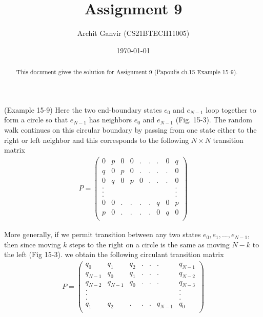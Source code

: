 \documentclass{beamer}
\title{Assignment 9}
\author{Archit Ganvir (CS21BTECH11005)}
\date{\today}
\begin{document}
\providecommand{\brak}[1]{\ensuremath{\left(#1\right)}}
\begin{frame}

\titlepage

\begin{abstract}
This document gives the solution for Assignment 9 (Papoulis ch.15 Example 15-9).
\end{abstract}

\end{frame}

\logo{}

\begin{frame}

(Example 15-9) Here the two end-boundary states $e_0$ and $e_{N - 1}$ loop together to form a circle so that $e_{N - 1}$ has neighbors $e_0$ and $e_{N - 1}$ (Fig. 15-3). The random walk continues on this circular boundary by passing from one state either to the right or left neighbor and this corresponds to the following $N \times N$ transition matrix
\begin{align}
P = 
\begin{pmatrix}
0 & p & 0 & 0 & . & . & . & 0 & q \\
q & 0 & p & 0 & . & . & . & . & 0 \\
0 & q & 0 & p & 0 & . & . & . & 0 \\
. & & & & & & & & . \\
. & & & & & & & & . \\
. & & & & & & & & . \\
0 & 0 & . & . & . & . & q & 0 & p \\
p & 0 & . & . & . & . & 0 & q & 0 \\
\end{pmatrix}
\end{align}

\end{frame}

\begin{frame}

More generally, if we permit transition between any two states $e_0, e_1,...,e_{N - 1}$, then since moving $k$ steps to the right on a circle is the same as moving $N - k$ to the left (Fig 15-3). we obtain the following circulant transition matrix
\begin{align}
P = 
\begin{pmatrix}
q_0 & q_1 & q_2 & . & . & . & q_{N - 1} \\
q_{N - 1} & q_0 & q_1 & . & . & . & q_{N - 2} \\
q_{N - 2} & q_{N - 1} & q_0 & . & . & . & q_{N - 3} \\
. & & & & & & . \\
. & & & & & & . \\
. & & & & & & . \\
q_1 & q_ 2 & . & . & . & q_{N - 1} & q_0 \\
\end{pmatrix}
\end{align}

\end{frame}
\end{document}
